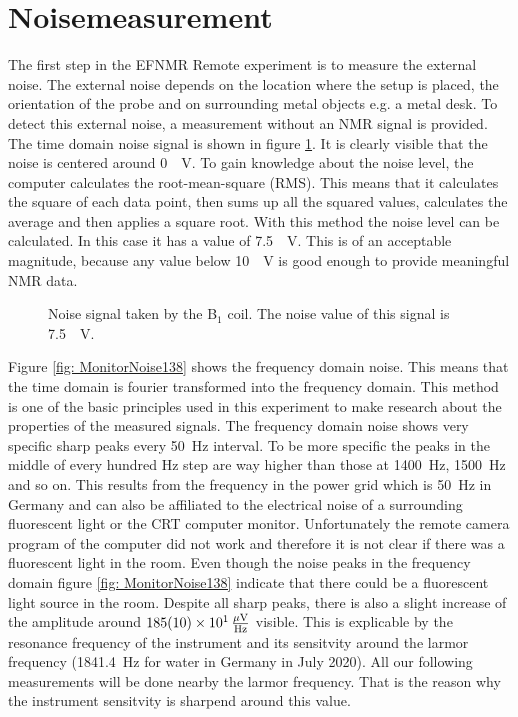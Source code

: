 \section{Noisemeasurement}
\label{sec:Noisemeasurement}
The first step in the EFNMR Remote experiment is to measure the external noise.
The external noise depends on the location where the setup is placed, the orientation of the probe and on surrounding metal objects e.g. a metal desk.
To detect this external noise, a measurement without an NMR signal is provided.
The time domain noise signal is shown in figure \ref{fig: noise}.
It is clearly visible that the noise is centered around \SI{0}{\mu \volt}.
To gain knowledge about the noise level, the computer calculates the root-mean-square (RMS).
This means that it calculates the square of each data point, then sums up all the squared values, calculates the average and then applies a square root.
With this method the noise level can be calculated.
In this case it has a value of \SI{7.5}{\mu \volt}.
This is of an acceptable magnitude, because any value below \SI{10}{\mu \volt} is good enough to provide meaningful NMR data.

\begin{figure}[H]
    \centering
    
    \caption[Noise signal taken by the B$_1$ coil.]{Noise signal taken by the B$_1$ coil.
    The noise value of this signal is \SI{7.5}{\mu \volt}.}
    \label{fig: noise}
\end{figure}

Figure \ref{fig: MonitorNoise138} shows the frequency domain noise.
This means that the time domain is fourier transformed into the frequency domain.
This method is one of the basic principles used in this experiment to make research about the properties of the measured signals.
The frequency domain noise shows very specific sharp peaks every \SI{50}{\hertz} interval.
To be more specific the peaks in the middle of every hundred \si{\hertz} step are way higher than those at \SI{1400}{\hertz}, \SI{1500}{\hertz} and so on.
This results from the frequency in the power grid which is \SI{50}{\hertz} in Germany and can also be affiliated to the electrical noise of a surrounding fluorescent light or the CRT computer monitor.
Unfortunately the remote camera program of the computer did not work and therefore it is not clear if there was a fluorescent light in the room.
Even though the noise peaks in the frequency domain figure \ref{fig: MonitorNoise138} indicate that there could be a fluorescent light source in the room.
Despite all sharp peaks, there is also a slight increase of the amplitude around $\SI{185 \pm 10 e1}{\frac{\mu \volt}{\hertz}}$ visible.
This is explicable by the resonance frequency of the instrument and its sensitvity around the larmor frequency (\SI{1841.4}{\hertz} for water in Germany in July 2020).
All our following measurements will be done nearby the larmor frequency.
That is the reason why the instrument sensitvity is sharpend around this value.

